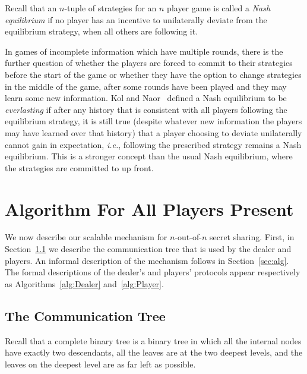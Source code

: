 \documentclass[12pt]{article}
\theoremstyle{definition}
\newcommand{\ie}{\emph{i.e.}}
\begin{document}
Recall that an $n$-tuple of strategies for an $n$ player game is called 
a \emph{Nash equilibrium} if no player has an incentive to unilaterally deviate 
from the equilibrium strategy, when all others are following it. 



In games of incomplete information which have multiple rounds, there is 
the further question of whether the players are forced to commit to their 
strategies before the start of the game or whether they have the option to 
change strategies in the middle of the game, after some rounds have been 
played and they may learn some new information. Kol and 
Naor~\cite{kol2008games} defined a Nash equilibrium to be 
\emph{everlasting} if after any history that is consistent with all 
players following the equilibrium strategy, it is still true (despite 
whatever new information the players may have learned over that history) 
that a player choosing to deviate unilaterally cannot gain in expectation, 
\ie, following the prescribed strategy remains a Nash equilibrium. 
This is a stronger concept than the usual Nash equilibrium, where 
the strategies are committed to up front.





\section{Algorithm For All Players Present}
\label{s:algnofn}
We now describe our scalable mechanism for $n$-out-of-$n$ secret
sharing. First, in Section~\ref{sec:commtree} we describe the communication 
tree that is used by the dealer and players. An informal description
of the mechanism follows in Section~\ref{sec:alg}. The formal descriptions 
of the dealer's and players' protocols 
appear respectively as Algorithms~\ref{alg:Dealer} and~\ref{alg:Player}.


\subsection{The Communication Tree}\label{sec:commtree}


Recall that a complete binary tree is a binary tree in which all the 
internal nodes have exactly two descendants, all the leaves are at the 
two deepest levels, and the leaves on the deepest level are as far left 
as possible.
\end{document}
